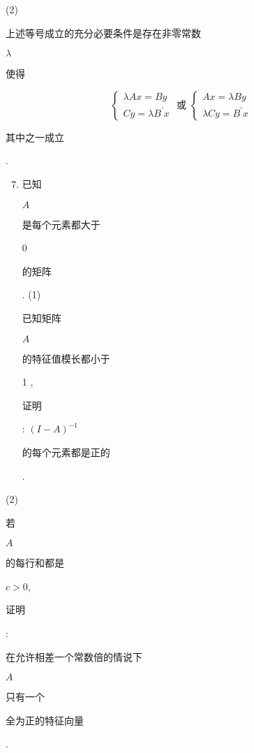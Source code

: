 \documentclass[10pt]{article}
\begin{document}
(2) \begin{CJK}{UTF8}{mj}上述等号成立的充分必要条件是存在非零常数\end{CJK} $\lambda$ \begin{CJK}{UTF8}{mj}使得\end{CJK}
$$
\left\{\begin{array} { l } 
{ \lambda A x = B y } \\
{ C y = \lambda B ^ { \prime } x }
\end{array} \text { 或 } \left\{\begin{array}{l}
A x=\lambda B y \\
\lambda C y=B^{\prime} x
\end{array}\right.\right.
$$
\begin{CJK}{UTF8}{mj}其中之一成立\end{CJK}.

\begin{enumerate}
  \setcounter{enumi}{6}
  \item \begin{CJK}{UTF8}{mj}已知\end{CJK} $A$ \begin{CJK}{UTF8}{mj}是每个元素都大于\end{CJK} 0 \begin{CJK}{UTF8}{mj}的矩阵\end{CJK}. (1) \begin{CJK}{UTF8}{mj}已知矩阵\end{CJK} $A$ \begin{CJK}{UTF8}{mj}的特征值模长都小于\end{CJK} 1 , \begin{CJK}{UTF8}{mj}证明\end{CJK}: $(I-A)^{-1}$ \begin{CJK}{UTF8}{mj}的每个元素都是正的\end{CJK}.
\end{enumerate}
(2) \begin{CJK}{UTF8}{mj}若\end{CJK} $A$ \begin{CJK}{UTF8}{mj}的每行和都是\end{CJK} $c>0$, \begin{CJK}{UTF8}{mj}证明\end{CJK}: \begin{CJK}{UTF8}{mj}在允许相差一个常数倍的情说下\end{CJK} $A$ \begin{CJK}{UTF8}{mj}只有一个\end{CJK} \begin{CJK}{UTF8}{mj}全为正的特征向量\end{CJK}.
\end{document}
